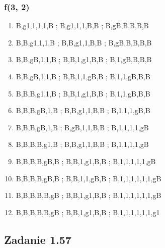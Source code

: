 \documentclass[leqno]{article}
\begin{document}
            \subsubsection{f(3, 2)}
                \begin{enumerate}
                    \item {}       {B,g1,1,1,1,B ; B,g1,1,1,B,B ; B,gB,B,B,B,B}
                    \item {}         {B,B,g1,1,1,B ; B,B,g1,1,B,B ; B,gB,B,B,B,B}
                    \item {}        {B,B,gB,1,1,B ; B,B,1,g1,B,B ; B,1,gB,B,B,B}
                    \item {}      {B,B,gB,1,1,B ; B,B,1,1,gB,B ; B,1,1,gB,B,B}
                    \item {}        {B,B,B,g1,1,B ; B,B,1,g1,B,B ; B,1,1,gB,B,B}
                    \item {}       {B,B,B,gB,1,B ; B,B,g1,1,B,B ; B,1,1,1,gB,B}
                    \item {}     {B,B,B,gB,1,B ; B,gB,1,1,B,B ; B,1,1,1,1,gB}
                    \item {}       {B,B,B,B,g1,B ; B,B,g1,1,B,B ; B,1,1,1,1,gB}
                    \item {}      {B,B,B,B,gB,B ; B,B,1,g1,B,B ; B,1,1,1,1,1,gB}
                    \item {}    {B,B,B,B,gB,B ; B,B,1,1,gB,B ; B,1,1,1,1,1,1,gB}
                    \item {}  {B,B,B,B,B,gB ; B,B,1,g1,B,B ; B,1,1,1,1,1,1,gB}
                    \item {}  {B,B,B,B,B,gB ; B,B,1,g1,B,B ; B,1,1,1,1,1,1,g1}
                \end{enumerate}


        \newpage
        \subsection{Zadanie 1.57}
                
\end{document}

